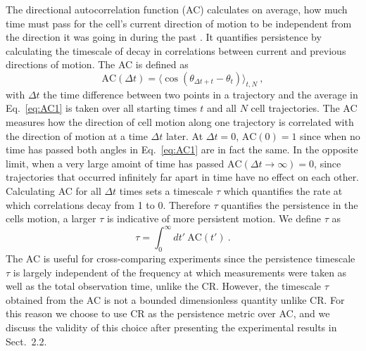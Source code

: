 The directional autocorrelation function (AC) calculates on average, how much time must pass for the cell's current direction of motion to be independent from the direction it was going in during the past \cite{gorelik2014quantitative,dang2013inhibitory}.
It quantifies persistence by calculating the timescale of decay in correlations between current and previous directions of motion.
The AC is defined as
\begin{equation} \label{eq:AC1}
    \text{AC}(\Delta t) = \langle \cos(\theta_{\Delta t + t}-\theta_{t}) \rangle_{t,N} \ ,
\end{equation}
with $\Delta t$ the time difference between two points in a trajectory and the average in Eq.\ \ref{eq:AC1} is taken over all starting times $t$ and all $N$ cell trajectories. The AC measures how the direction of cell motion along one trajectory is correlated with the direction of motion at a time $\Delta t$ later.
At $\Delta t = 0$, $\text{AC}(0) = 1$ since when no time has passed both angles in Eq.\ \ref{eq:AC1} are in fact the same. In the opposite limit, when a very large amoint of time has passed
$\text{AC}(\Delta t \to \infty) = 0$,
since trajectories that occurred infinitely far apart in time have no effect on each other. Calculating AC for all $\Delta t$ times sets a timescale $\tau$ which quantifies the rate at which correlations decay from 1 to 0. Therefore $\tau$ quantifies the persistence in the cells motion, a larger $\tau$ is indicative of more persistent motion. We define $\tau$ as
\begin{equation} \label{eq:tau1}
    \tau = \int_0^\infty dt' \ \text{AC}(t') \ .
\end{equation}
The AC is useful for cross-comparing experiments since the persistence timescale $\tau$ is largely independent of the frequency at which measurements were taken as well as the total observation time, unlike the CR. However, the timescale $\tau$ obtained from the AC is not a bounded dimensionless quantity unlike CR. For this reason we choose to use CR as the persistence metric over AC, and we discuss the validity of this choice after presenting the experimental results in Sect.\ 2.2.

